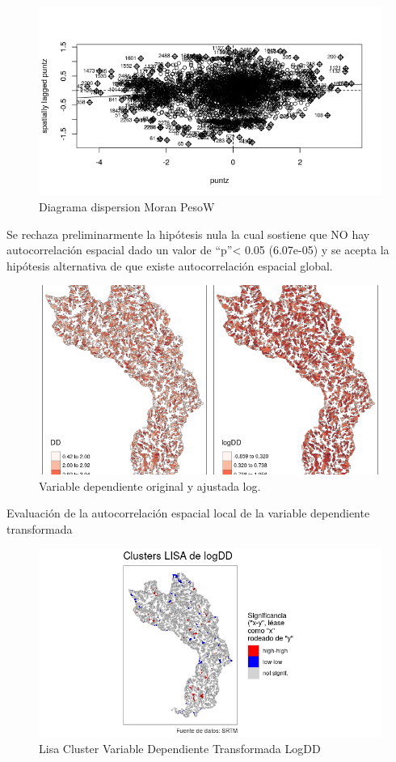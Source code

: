 \documentclass[11pt,]{article}
\begin{document}
\begin{figure}
\centering
\includegraphics{Imagenes/MoranplotpesoW.png}
\caption{Diagrama dispersion Moran PesoW}
\end{figure}

Se rechaza preliminarmente la hipótesis nula la cual sostiene que NO hay
autocorrelación espacial dado un valor de ``p''\textless{} 0.05
(6.07e-05) y se acepta la hipótesis alternativa de que existe
autocorrelación espacial global.

\begin{figure}
\centering
\includegraphics{Imagenes/p2DDlogDD.png}
\caption{Variable dependiente original y ajustada log.}
\end{figure}

Evaluación de la autocorrelación espacial local de la variable
dependiente transformada

\begin{figure}
\centering
\includegraphics{Imagenes/ClusterLisalogDD.png}
\caption{Lisa Cluster Variable Dependiente Transformada LogDD}
\end{figure}
\end{document}
